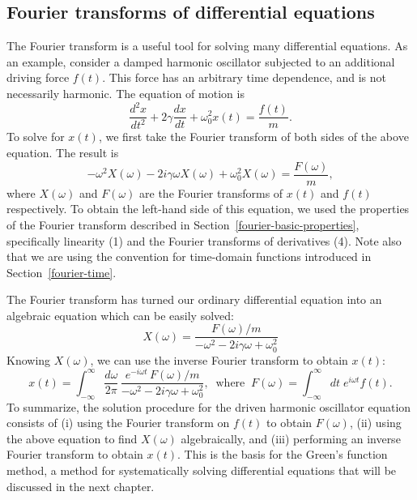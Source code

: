 \documentclass[10pt,a4paper]{article}
\begin{document}
\subsection{Fourier transforms of differential equations}
\label{fourier-transforms-of-differential-equations}

The Fourier transform is a useful tool for solving many differential
equations. As an example, consider a damped harmonic oscillator
subjected to an additional driving force $f(t)$. This force has an
arbitrary time dependence, and is not necessarily harmonic.  The
equation of motion is
\begin{equation}
\frac{d^2 x}{dt^2} + 2\gamma \frac{dx}{dt} + \omega_0^2 x(t) = \frac{f(t)}{m}.
\end{equation}
To solve for $x(t)$, we first take the Fourier transform of both sides
of the above equation. The result is
\begin{equation}
- \omega^2 X(\omega) - 2 i\gamma \omega X(\omega) + \omega_0^2 X(\omega) = \frac{F(\omega)}{m},
\end{equation}
where $X(\omega)$ and $F(\omega)$ are the Fourier transforms of $x(t)$
and $f(t)$ respectively. To obtain the left-hand side of this
equation, we used the properties of the Fourier transform described in
Section~\ref{fourier-basic-properties}, specifically linearity (1) and
the Fourier transforms of derivatives (4). Note also that we are using
the convention for time-domain functions introduced in
Section~\ref{fourier-time}.

The Fourier transform has turned our ordinary differential equation into
an algebraic equation which can be easily solved:
\begin{equation}
X(\omega) = \frac{F(\omega)/m}{- \omega^2 - 2 i\gamma \omega + \omega_0^2}
\end{equation}
Knowing $X(\omega)$, we can use the inverse Fourier transform to
obtain $x(t)$:
\begin{equation}
x(t) = \int_{-\infty}^\infty \frac{d\omega}{2\pi} \, \frac{e^{-i\omega t}\, F(\omega)/m}{- \omega^2 - 2 i\gamma \omega + \omega_0^2}, \;\; \mathrm{where}\;\; F(\omega) = \int_{-\infty}^\infty dt\; e^{i\omega t} f(t).
\end{equation}
To summarize, the solution procedure for the driven harmonic
oscillator equation consists of (i) using the Fourier transform on
$f(t)$ to obtain $F(\omega)$, (ii) using the above equation to find
$X(\omega)$ algebraically, and (iii) performing an inverse Fourier
transform to obtain $x(t)$. This is the basis for the Green's function
method, a method for systematically solving differential equations
that will be discussed in the next chapter.
\end{document}
